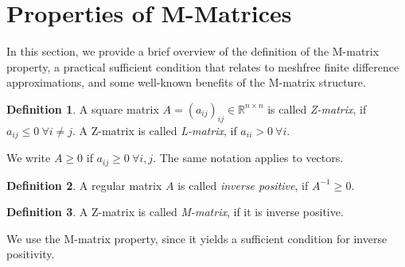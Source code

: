 \documentclass[reqno]{amsart}
\theoremstyle{plain}
\theoremstyle{definition}
\newtheorem{defn}{Definition}
\theoremstyle{remark}
\begin{document}
\section{Properties of M-Matrices}
\label{seibold:sec:m_matrices}
In this section, we provide a brief overview of the definition of the M-matrix property,
a practical sufficient condition that relates to meshfree finite difference
approximations, and some well-known benefits of the M-matrix structure.
\begin{defn}
\label{seibold:def:L_matrix}
A square matrix $A=(a_{ij})_{ij}\in\mathbb{R}^{n\times n}$ is called \emph{Z-matrix},
if $a_{ij}\le 0 \ \forall i\neq j$.
A Z-matrix is called \emph{L-matrix}, if $a_{ii}>0 \ \forall i$.
\end{defn}
We write $A\ge 0$ if $a_{ij}\ge 0 \ \forall i,j$. The same notation applies to vectors.
\begin{defn}
A regular matrix $A$ is called \emph{inverse positive}, if $A^{-1}\ge 0$.
\end{defn}
\begin{defn}
A Z-matrix is called \emph{M-matrix}, if it is inverse positive.
\end{defn}
We use the M-matrix property, since it yields a sufficient condition for inverse
positivity.
\end{document}
